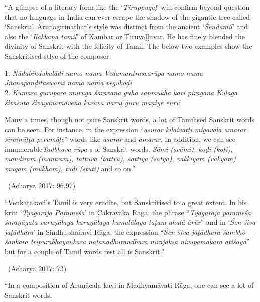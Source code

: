 \begin{myquote}
“A glimpse of a literary form like the ‘\textit{Tiruppugaḷ}’ will confirm beyond question that no language in India can ever escape the shadow of the gigantic tree called ‘Sanskrit’. Aruṇagirināthar’s style was distinct from the ancient ‘\textit{Śendamiḷ}’ and also the ‘\textit{Iḷakkaṇa tamiḷ}’ of Kambar or Tiruvaḷḷuvar. He has finely blended the divinity of Sanskrit with the felicity of Tamil. The below two examples show the Sanskritised stlye of the composer.
\end{myquote}

\begin{myquote}
 1. \textit{Nādabindukalādi namo nama Vedamantrasvarūpa namo nama Jñanapanḍitaswāmi namo nama vegukoḍi}\\
 2. \textit{Kumara gurupara muruga śaravaṇa guha ṣaṇmukha kari piragāna Kuḷaga śivasuta śivayanamavena kurava naruḷ guru maṇiye enru}
\end{myquote}

\begin{myquote}
Many a times, though not pure Sanskrit words, a lot of Tamilised Sanskrit words can be seen. For instance, in the expression “\textit{asurar kiḷaivāṭṭi migavāḷa amarar siraimīṭṭa perumāḷe}” words like \textit{asurar }and\textit{ amarar}. In addition, we can see innumerable\textit{Tadbhava rūpa}-s of Sanskrit words. \textit{Sāmi (svāmi), koḍi (koṭi), mandiram (mantram), tattuva (tattva), sattiya (satya), vākkiyam (vākyam) mugam (mukham), tudi (stuti)} and so on.”

~\hfill (Acharya 2017: 96,97)
\end{myquote}

\begin{myquote}
“Venkaṭakavi’s Tamil is very erudite, but Sanskritised to a great extent. In his kriti ‘\textit{Tyāgarāja Parameśa}’ in Cakravāka Rāga, the phrase “\textit{Tyāgarāja parameśa śaraṇāgata varuṇālaya karuṇālaya kamalālaya taṭam ahalā ārūr}” and in ‘\textit{Śen śiva jaṭādhara}’ in Sindhubhairavi Rāga, the expression “\textit{Śen śiva jaṭādhara śambho śankara tripurabhayankara naṭanadhurandhara nīrajākṣa nirupamakara atiśaya}” but for a couple of Tamil words rest all is Sanskrit.”

~\hfill (Acharya 2017: 73)
\end{myquote}

\begin{myquote}
“In a composition of Aruṇācala kavi in Madhyamāvati Rāga, one can see a lot of Sanskrit words.
\end{myquote}

